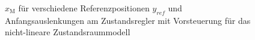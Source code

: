 \documentclass[
	pagesize,
	fontsize=12pt,
	paper=a4,
	oneside,
   reqno
]{scrartcl}
\begin{document}
\begin{figure}[H]
    \centering
    \caption[$x_{\mathrm{M}}$ für Regler mit Vorsteuerung (nicht-linear)]{$x_{\mathrm{M}}$ für verschiedene Referenzpositionen $y_{ref}$ und Anfangsauslenkungen am Zustandsregler mit Vorsteuerung für das nicht-lineare Zustandsraummodell}
    \label{fig:Bild25}
\end{figure}
\end{document}
